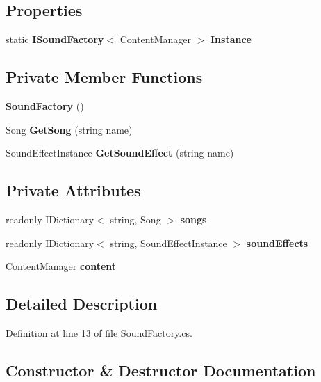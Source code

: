 \subsection*{Properties}
\begin{DoxyCompactItemize}
\item 
static \textbf{ I\+Sound\+Factory}$<$ Content\+Manager $>$ \textbf{ Instance}\hspace{0.3cm}{\ttfamily  [get]}
\end{DoxyCompactItemize}
\subsection*{Private Member Functions}
\begin{DoxyCompactItemize}
\item 
\textbf{ Sound\+Factory} ()
\item 
Song \textbf{ Get\+Song} (string name)
\item 
Sound\+Effect\+Instance \textbf{ Get\+Sound\+Effect} (string name)
\end{DoxyCompactItemize}
\subsection*{Private Attributes}
\begin{DoxyCompactItemize}
\item 
readonly I\+Dictionary$<$ string, Song $>$ \textbf{ songs}
\item 
readonly I\+Dictionary$<$ string, Sound\+Effect\+Instance $>$ \textbf{ sound\+Effects}
\item 
Content\+Manager \textbf{ content}
\end{DoxyCompactItemize}


\subsection{Detailed Description}


Definition at line 13 of file Sound\+Factory.\+cs.



\subsection{Constructor \& Destructor Documentation}
\mbox{\label{classMelloMario_1_1Factories_1_1SoundFactory_abb6e2af2118b9543e3fc808e9a0177e2}} 
